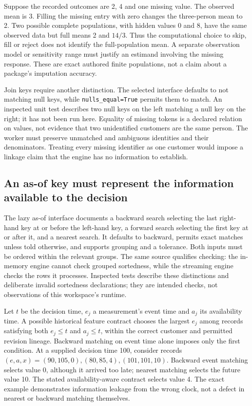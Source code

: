 Suppose the recorded outcomes are 2, 4 and one missing value. The observed
mean is 3. Filling the missing entry with zero changes the three-person
mean to 2. Two possible complete populations, with hidden values 0 and 8,
have the same observed data but full means 2 and $14/3$. Thus the
computational choice to skip, fill or reject does not identify the
full-population mean. A separate observation model or sensitivity range
must justify an estimand involving the missing response. These are exact
authored finite populations, not a claim about a package's imputation
accuracy.\citep{exec23_polars_reference}

Join keys require another distinction. The selected interface defaults to
not matching null keys, while \texttt{nulls\_equal=True} permits them to
match. An inspected unit test describes two null keys on the left matching
a null key on the right; it has not been run here. Equality of missing
tokens is a declared relation on values, not evidence that two unidentified
customers are the same person. The worker must preserve unmatched and
ambiguous identities and their denominators. Treating every missing
identifier as one customer would impose a linkage claim that the engine
has no information to establish.\citep{exec23_polars_sources}

\subsection{An as-of key must represent the information available to the decision}

The lazy as-of interface documents a backward search selecting the last
right-hand key at or before the left-hand key, a forward search selecting
the first key at or after it, and a nearest search. It defaults to
backward, permits exact matches unless told otherwise, and supports
grouping and a tolerance. Both inputs must be ordered within the relevant
groups. The same source qualifies checking: the in-memory engine cannot
check grouped sortedness, while the streaming engine checks the rows it
processes. Inspected tests describe these distinctions and deliberate
invalid sortedness declarations; they are intended checks, not observations
of this workspace's runtime.\citep{exec23_polars_sources}

Let $t$ be the decision time, $e_j$ a measurement's event time and $a_j$
its availability time. A possible historical feature contract chooses
the largest $e_j$ among records satisfying both $e_j\leq t$ and
$a_j\leq t$, within the correct customer and permitted revision lineage.
Backward matching on event time alone imposes only the first condition.
At a supplied decision time 100, consider records
$(e,a,x)=(90,105,0),(80,85,4),(101,101,10)$. Backward event matching
selects value 0, although it arrived too late; nearest matching selects
the future value 10. The stated availability-aware contract selects value
4. The exact example demonstrates information leakage from the wrong
clock, not a defect in nearest or backward matching themselves.
\citep{exec23_polars_reference}

